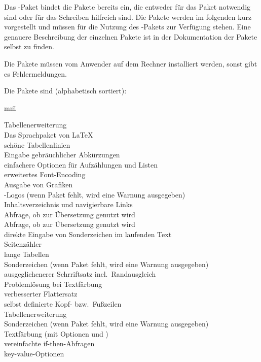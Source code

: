 Das -Paket bindet die Pakete bereits ein, die entweder für das Paket notwendig sind oder für das Schreiben hilfreich sind.
Die Pakete werden im folgenden kurz vorgestellt und müssen für die Nutzung des -Pakets zur Verfügung stehen.
Eine genauere Beschreibung der einzelnen Pakete ist in der Dokumentation der Pakete selbst zu finden.

Die Pakete müssen vom Anwender auf dem Rechner installiert werden, sonst gibt es Fehlermeldungen.

Die Pakete sind (alphabetisch sortiert):
\begin{tabbing}
	mm\=\kill

	\>Tabellenerweiterung\\
	\>Das Sprachpaket von \LaTeX\\
	\>schöne Tabellenlinien\\
	\>Eingabe gebräuchlicher Abkürzungen\\
	\>einfachere Optionen für Aufzählungen und Listen\\
	\>erweitertes Font-Encoding\\
	\>Ausgabe von Grafiken\\
	\>-Logos (wenn Paket fehlt, wird eine Warnung ausgegeben)\\
	\>Inhaltsverzeichnis und navigierbare Links\\
	\>Abfrage, ob  zur Übersetzung genutzt wird\\
	\>Abfrage, ob  zur Übersetzung genutzt wird\\
	\>direkte Eingabe von Sonderzeichen im laufenden Text\\
	\>Seitenzähler\\
	\>lange Tabellen\\
	\>Sonderzeichen (wenn Paket fehlt, wird eine Warnung ausgegeben)\\
	\>ausgeglichenerer Schrriftsatz incl.\ Randausgleich\\
	\>Problemlösung bei Textfärbung\\
	\>verbesserter Flattersatz\\
	\>selbst definierte Kopf- bzw.\ Fußzeilen\\
	\>Tabellenerweiterung\\
	\>Sonderzeichen (wenn Paket fehlt, wird eine Warnung ausgegeben)\\
	\>Textfärbung (mit Optionen  und )\\
	\>vereinfachte if-then-Abfragen\\
	\>key-value-Optionen
\end{tabbing}

